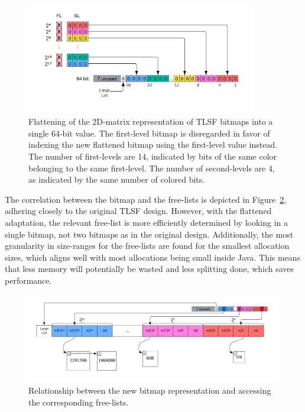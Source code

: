 \begin{figure}[H]
    \centering
    \includegraphics[width=0.9\textwidth]{figures/bitmap_flattening.png}
    \caption{Flattening of the 2D-matrix representation of TLSF bitmaps into a single 64-bit value. The first-level bitmap is disregarded in favor of indexing the new flattened bitmap using the first-level value instead. The number of first-levels are 14, indicated by bits of the same color belonging to the same first-level. The number of second-levels are 4, as indicated by the same number of colored bits.}
    \label{fig:bitmap_flattening}
\end{figure}

The correlation between the bitmap and the free-lists is depicted in Figure~\ref{fig:bitmap_relationship}, adhering closely to the original TLSF design. However, with the flattened adaptation, the relevant free-list is more efficiently determined by looking in a single bitmap, not two bitmaps as in the original design. Additionally, the most granularity in size-ranges for the free-lists are found for the smallest allocation sizes, which aligns well with most allocations being small inside Java. This means that less memory will potentially be wasted and less splitting done, which saves performance.

\begin{figure}[H]
    \centering
    \includegraphics[width=1\textwidth]{figures/bitmap_relationship.png}
    \caption{Relationship between the new bitmap representation and accessing the corresponding free-lists.}
    \label{fig:bitmap_relationship}
\end{figure}

